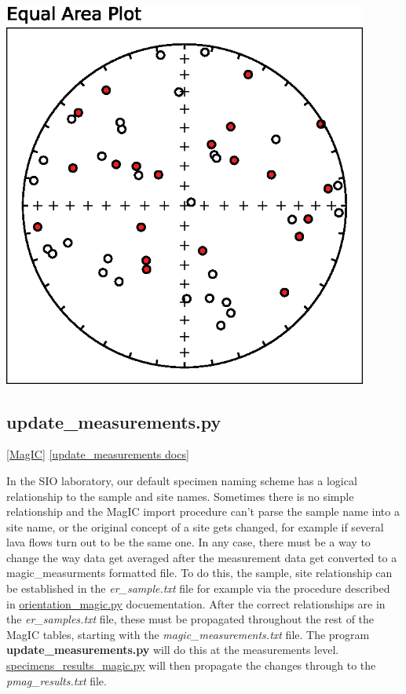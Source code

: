 \documentclass[11pt]{book}
\begin{document}
{{\includegraphics[width=12cm]{EPSfiles/uniform.eps}


\subsection{update\_measurements.py}
\href{#MagIC}{[MagIC]}
\href{http://earthref.org/PmagPy/pmagpydocs/update_measurements-module.html}{[update\_measurements docs]}

In the SIO laboratory, our default specimen naming scheme has a logical relationship to the sample and site names.  
Sometimes there is no simple relationship and the MagIC import procedure can't parse the sample name into a site name, or the original concept of a site gets changed, for example if several lava flows turn out to be the same one.  In any case, there must be a way to change the way data get averaged after the measurement data get converted to a magic\_measurments formatted file.  To do this, the sample, site relationship can be established in the {\it er\_sample.txt} file for example via the procedure described in \href{#orientation_magic.py}{orientation\_magic.py} docuementation.  After the correct relationships are in the {\it er\_samples.txt} file, these must be propagated throughout the rest of the MagIC tables, starting with the {\it magic\_measurements.txt} file.  The program {\bf update\_measurements.py} will do this at the measurements level.  \href{#specimens_results_magic.py}{specimens\_results\_magic.py} will then propagate the changes through to the {\it pmag\_results.txt} file.  


}}
\end{document}
